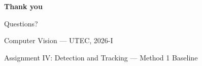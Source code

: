 \documentclass[aspectratio=169]{beamer}
\begin{document}
{
  \begin{frame}[plain]
    \centering
    \vspace{2cm}
    {\color{white}\Huge\bfseries Thank you\par}
    \vspace{0.8em}
    {\color{uteccyan}\large Questions?\par}
    \vspace{1.5em}
    {\color{white!70}Computer Vision --- UTEC, 2026-I\par}
    \vspace{0.3em}
    {\color{white!50}\small Assignment IV: Detection and Tracking --- Method 1 Baseline\par}
  \end{frame}
}
\end{document}
